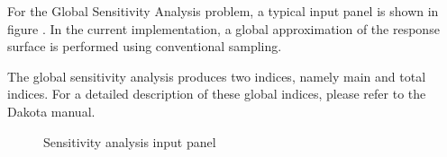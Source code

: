 For the Global Sensitivity Analysis problem, a typical input panel is shown in figure . In the current implementation, a global approximation of the response surface is performed using conventional sampling. 

The global sensitivity analysis produces two indices, namely main and total indices. For a detailed description of these global indices, please refer to the Dakota manual. 

\begin{figure}[!htbp]
  \caption{Sensitivity analysis input panel}
  \label{fig:sens}
\end{figure}





